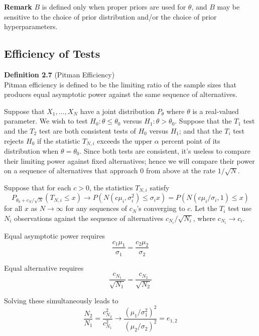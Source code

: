 \documentclass[12pt]{article}
\numberwithin{equation}{section}
\begin{document}
\textbf{Remark}
$B$ is defined only when proper priors are used for $\theta$, and $B$ may be sensitive to the choice of prior distribution and/or the choice of prior hyperparameters. 


\subsection{Efficiency of Tests}
\textbf{Definition 2.7} (Pitman Efficiency) \\
Pitman efficiency is defined to be the limiting ratio of the sample sizes that produces equal asymptotic power against the same sequence of alternatives.

Suppose that $X_1, \ldots, X_N$ have a joint distribution $P_{\theta}$ where $\theta$ is a real-valued parameter. We wish to test $H_0: \theta \le \theta_0$ versus $H_1: \theta > \theta_0$. Suppose that the $T_1$ test and the $T_2$ test are both consistent tests of $H_0$ versus $H_1$; and that the $T_i$ test rejects $H_0$ if the statistic $T_{N, i}$ exceeds the upper $\alpha$ percent point of its distribution when $\theta = \theta_0$. Since both tests are consistent, it’s useless to compare their limiting
power against fixed alternatives; hence we will compare their power on a
sequence of alternatives that approach 0 from above at the rate 
$1 / \sqrt{N}$. 

Suppose that for each $c > 0$, the statistics $T_{N, i}$ satisfy
\begin{equation*}
  P_{\theta_0 + c_N / \sqrt{N}}(T_{N, i} \le x) \to P(N(c \mu_i, \sigma_i^2) \le \sigma_i x) = P(N(c \mu_i / \sigma_i, 1) \le x)
\end{equation*}
for all $x$ as $N \to \infty$ for any sequences of $c_N$'s converging to $c$. Let the $T_i$ test use $N_i$ observations against the sequence of alternatives $c_{N_i} / \sqrt{N_i}$, where $c_{N_i} \to c_i$. 

Equal asymptotic power requires
\begin{equation*}
  \frac{c_1 \mu_1}{\sigma_1} = \frac{c_2 \mu_2}{\sigma_2}
\end{equation*}

Equal alternative requires
\begin{equation*}
  \frac{c_{N_1}}{\sqrt{N_1}} = \frac{c_{N_2}}{\sqrt{N_2}}
\end{equation*}

Solving these simultaneously leads to
\begin{equation*}
  \frac{N_2}{N_1} = \frac{c^2_{N_2}}{c^2_{N_1}} \to 
    \frac{(\mu_1 / \sigma_1^2)^2}{(\mu_2 / \sigma_2)^2} = e_{1, 2}
\end{equation*}
\end{document}
